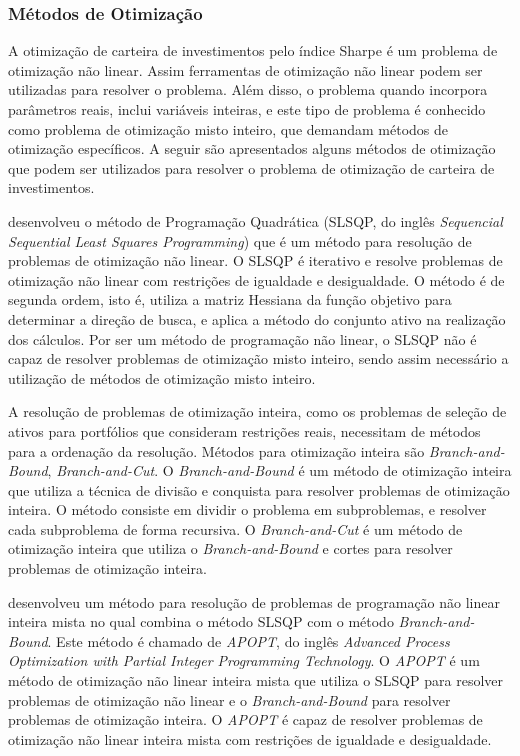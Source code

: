             \subsubsection{Métodos de Otimização}

                \ipar A otimização de carteira de investimentos pelo índice Sharpe é um problema de otimização não linear. Assim ferramentas de otimização não linear podem ser utilizadas para resolver o problema. Além disso, o problema quando incorpora parâmetros reais, inclui variáveis inteiras, e este tipo de problema é conhecido como problema de otimização misto inteiro, que demandam métodos de otimização específicos. A seguir são apresentados alguns métodos de otimização que podem ser utilizados para resolver o problema de otimização de carteira de investimentos.

                \ipar {} desenvolveu o método de Programação Quadrática (\acrshort{SLSQP}, do inglês \textit{Sequencial Sequential Least Squares Programming}) que é um método para resolução de problemas de otimização não linear. O \acrshort{SLSQP} é iterativo e resolve problemas de otimização não linear com restrições de igualdade e desigualdade. O método é de segunda ordem, isto é, utiliza a matriz Hessiana da função objetivo para determinar a direção de busca, e aplica a método do conjunto ativo na realização dos cálculos. Por ser um método de programação não linear, o \acrshort{SLSQP} não é capaz de resolver problemas de otimização misto inteiro, sendo assim necessário a utilização de métodos de otimização misto inteiro.

                \ipar A resolução de problemas de otimização inteira, como os problemas de seleção de ativos para portfólios que consideram restrições reais, necessitam de métodos para a ordenação da resolução. Métodos para otimização inteira são \textit{Branch-and-Bound}, \textit{Branch-and-Cut}. O \textit{Branch-and-Bound} é um método de otimização inteira que utiliza a técnica de divisão e conquista para resolver problemas de otimização inteira. O método consiste em dividir o problema em subproblemas, e resolver cada subproblema de forma recursiva. O \textit{Branch-and-Cut} é um método de otimização inteira que utiliza o \textit{Branch-and-Bound} e cortes para resolver problemas de otimização inteira.

                \ipar {} desenvolveu um método para resolução de problemas de programação não linear inteira mista no qual combina o método \acrshort{SLSQP} com o método \textit{Branch-and-Bound}. Este método é chamado de \textit{APOPT}, do inglês \textit{Advanced Process Optimization with Partial Integer Programming Technology}. O \textit{APOPT} é um método de otimização não linear inteira mista que utiliza o \acrshort{SLSQP} para resolver problemas de otimização não linear e o \textit{Branch-and-Bound} para resolver problemas de otimização inteira. O \textit{APOPT} é capaz de resolver problemas de otimização não linear inteira mista com restrições de igualdade e desigualdade.


